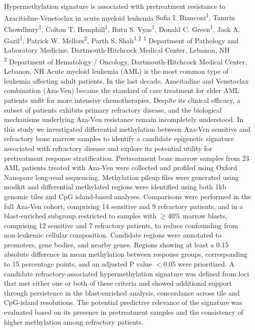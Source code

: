\makeabstract
    {
    Hypermethylation signature is associated with pretreatment resistance to Azacitidine-Venetoclax in acute myeloid leukemia
    }
    {
    Sofia I. Bianconi\textsuperscript{1}, Tamrin Chowdhury\textsuperscript{1}, Colton T. Hemphill\textsuperscript{1}, Rutu S. Vyas\textsuperscript{1}, Donald C. Green\textsuperscript{1}, Jack A. Gazil\textsuperscript{1}, Patrick W. Mellors\textsuperscript{2}, Parth S. Shah\textsuperscript{1,2}
    }
    {
    \textsuperscript{1} Department of Pathology and Laboratory Medicine, Dartmouth-Hitchcock Medical Center, Lebanon, NH\\
\textsuperscript{2} Department of Hematology / Oncology, Dartmouth-Hitchcock Medical Center, Lebanon, NH
    }
    {
    Acute myeloid leukemia (AML) is the most common type of leukemia affecting adult patients. In the last decade, Azacitadine and Venetoclax combination (Aza-Ven) became the standard of care treatment for elder AML patients unfit for more intensive chemotherapies. Despite its clinical efficacy, a subset of patients exhibits primary refractory disease, and the biological mechanisms underlying Aza-Ven resistance remain incompletely understood. In this study we investigated differential methylation between Aza-Ven sensitive and refractory bone marrow samples to identify a candidate epigenetic signature associated with refractory disease and explore its potential utility for pretreatment response stratification.
    }
    {
    Pretreatment bone marrow samples from 23 AML patients treated with Aza-Ven were collected and profiled using Oxford Nanopore long-read sequencing. Methylation pileup files were generated using modkit and differential methylated regions were identified using both 1kb genomic tiles and CpG island-based analyses. Comparisons were performed in the full Aza-Ven cohort, comprising 14 sensitive and 9 refractory patients, and in a blast-enriched subgroup restricted to samples with \ensuremath{\geq}40\% marrow blasts, comprising 12 sensitive and 7 refractory patients, to reduce confounding from non-leukemic cellular composition. Candidate regions were annotated to promoters, gene bodies, and nearby genes. Regions showing at least a 0.15 absolute difference in mean methylation between response groups, corresponding to 15 percentage points, and an adjusted P value \ensuremath{<}0.05 were prioritized. A candidate refractory-associated hypermethylation signature was defined from loci that met either one or both of these criteria and showed additional support through persistence in the blast-enriched analysis, concordance across tile and CpG-island resolutions. The potential predictive relevance of the signature was evaluated based on its presence in pretreatment samples and the consistency of higher methylation among refractory patients.
    }
